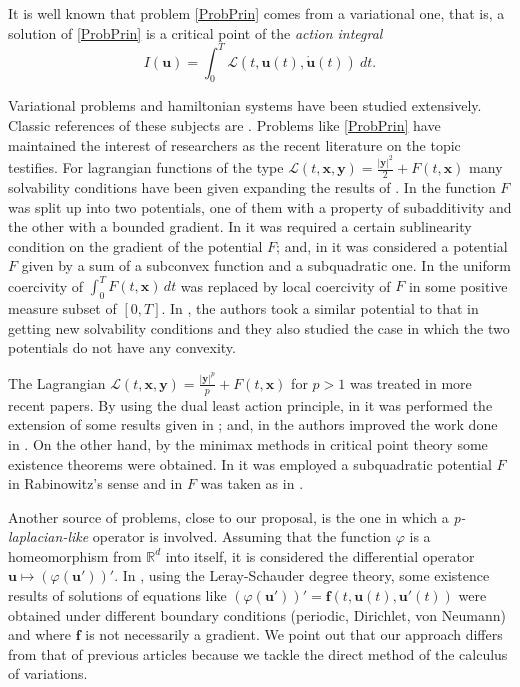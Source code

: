 \documentclass[twoside]{article}
\theoremstyle{remark}
\renewcommand{\b}[1]{\boldsymbol{#1}}
\newcommand{\rr}{\mathbb{R}}
\begin{document}
It is well known that problem \eqref{ProbPrin} comes from a variational one, that is,  a solution of \eqref{ProbPrin}  
is a critical point of the \emph{action integral}
\begin{equation}\label{integral_accion}
I(\b{u})=\int_{0}^T \mathcal{L}(t,\b{u}(t),\b{\dot{u}}(t))\ dt.
\end{equation}



Variational problems and hamiltonian systems  have been studied extensively. Classic references of these subjects are
\cite{mawhin2010critical,struwe2008variational,ekeland1999convex}. Problems like \eqref{ProbPrin} have maintained the interest of researchers as the recent literature on the topic testifies. 
For lagrangian functions of the type $\mathcal{L}(t,\b{x},\b{y})=\frac{|\b{y}|^2}{2}+F(t,\b{x})$  many solvability conditions have been given expanding the results of \cite{mawhin2010critical}.  
In  \cite{tang1995periodic} the function $F$ was split up into two potentials, one of them with a property of subadditivity and the other with a bounded gradient.
In \cite{tang1998periodic} it was required a certain sublinearity condition on the gradient of the potential $F$; and, 
in \cite{wu1999periodic} it was considered a potential $F$ given by a sum of a subconvex function and a  subquadratic one. 
In  \cite{tang2001periodic} the uniform coercivity of $\int_0^T F(t,\b{x})\,dt$
was replaced by local coercivity of $F$ in some positive measure subset of $[0,T]$.
In \cite{zhao2004periodic}, the authors took a similar potential to that in \cite{wu1999periodic} getting new solvability conditions 
and they also studied the case in which the two potentials do not have any convexity.


The Lagrangian  $\mathcal{L}(t,\b{x},\b{y})=\frac{|\b{y}|^p}{p}+F(t,\b{x})$
for $p>1$ was treated in more recent papers.
By using the dual least action principle, in \cite{Tian2007192}
it was performed the extension of some results given in \cite{mawhin2010critical};
and, in \cite{tang2010periodic} the authors improved the work done in \cite{wu1999periodic}.
On the other hand, by the minimax methods in critical point theory 
some existence theorems were obtained.
In \cite{xu2007some} it was employed a subquadratic potential $F$ in Rabinowitz{}'s sense and in \cite{ye2008periodic} $F$ was taken as in \cite{tang1998periodic}.

Another source of problems, close to our proposal, is the one in which a \emph {p-laplacian-like} operator is involved.
Assuming that the function $\varphi$ is a homeomorphism  from $\rr^d$ into itself, it is considered the differential operator
$\b u \mapsto (\varphi(\b u'))'$. 
In  \cite{C-2007,C-2009, 
Cristia-2008, manasevich2000boundary, manasevich1998periodic}, using 
the Leray-Schauder degree theory,
some existence results of solutions of equations 
like 
$(\varphi({\b u}'))'={\b f}(t,{\b u}(t),{\b u}'(t))$ were obtained 
under different boundary conditions (periodic, Dirichlet, von Neumann) 
and where $\b f$ is not necessarily a gradient. 
We point out that our approach 
differs from that of previous articles because
we tackle the direct method of the calculus of variations.
\end{document}
